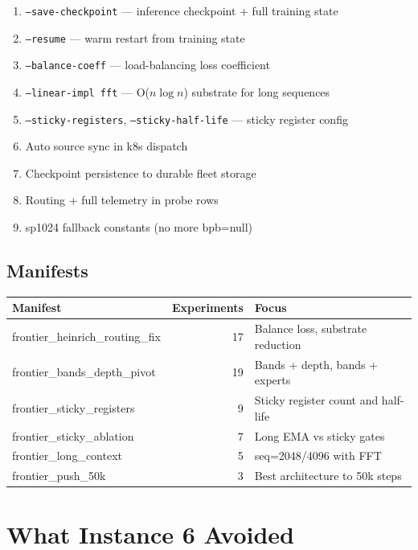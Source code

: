\documentclass[11pt,a4paper]{report}
\begin{document}
\begin{enumerate}[nosep]
\item \texttt{--save-checkpoint} --- inference checkpoint + full training state
\item \texttt{--resume} --- warm restart from training state
\item \texttt{--balance-coeff} --- load-balancing loss coefficient
\item \texttt{--linear-impl fft} --- O($n \log n$) substrate for long sequences
\item \texttt{--sticky-registers}, \texttt{--sticky-half-life} --- sticky register config
\item Auto source sync in k8s dispatch
\item Checkpoint persistence to durable fleet storage
\item Routing + full telemetry in probe rows
\item sp1024 fallback constants (no more bpb=null)
\end{enumerate}

\section{Manifests}

\begin{center}
\begin{tabular}{lrl}
\toprule
Manifest & Experiments & Focus \\
\midrule
frontier\_heinrich\_routing\_fix & 17 & Balance loss, substrate reduction \\
frontier\_bands\_depth\_pivot & 19 & Bands + depth, bands + experts \\
frontier\_sticky\_registers & 9 & Sticky register count and half-life \\
frontier\_sticky\_ablation & 7 & Long EMA vs sticky gates \\
frontier\_long\_context & 5 & seq=2048/4096 with FFT \\
frontier\_push\_50k & 3 & Best architecture to 50k steps \\
\bottomrule
\end{tabular}
\end{center}

\chapter{What Instance 6 Avoided}
\end{document}
